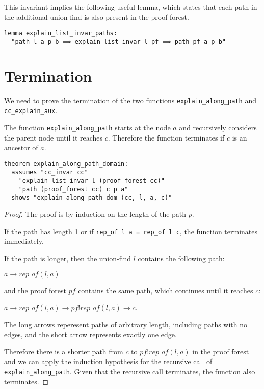 This invariant implies the following useful lemma, which states that each path in the additional union-find is also present in the proof forest.

\begin{lstlisting}
lemma explain_list_invar_paths:
  "path l a p b ⟹ explain_list_invar l pf ⟹ path pf a p b"
\end{lstlisting}

\section{Termination}

We need to prove the termination of the two functions \lstinline{explain_along_path} and \lstinline{cc_explain_aux}.

The function \lstinline{explain_along_path} starts at the node $a$ and recursively considers the parent node until it reaches $c$. Therefore the function terminates if $c$ is an ancestor of $a$.

\begin{lstlisting}
theorem explain_along_path_domain:
  assumes "cc_invar cc"
    "explain_list_invar l (proof_forest cc)"
    "path (proof_forest cc) c p a"
  shows "explain_along_path_dom (cc, l, a, c)"
\end{lstlisting}

\begin{proof}
The proof is by induction on the length of the path $p$.

If the path has length 1 or if \lstinline{rep_of l a = rep_of l c}, the function terminates immediately.

If the path is longer, then the union-find $l$ contains the following path:

$a \longrightarrow rep\_of(l,a)$

and the proof forest $pf$ contains the same path, which continues until it reaches $c$:

$a \longrightarrow rep\_of(l,a) \rightarrow pf ! rep\_of(l,a) \longrightarrow c$.

The long arrows reperesent paths of arbitrary length, including paths with no edges, and the short arrow represents exactly one edge.

Therefore there is a shorter path from $c$ to $pf ! rep\_of(l,a)$ in the proof forest and we can apply the induction hypothesis for the recursive call of \lstinline{explain_along_path}. Given that the recursive call terminates, the function also terminates.
\end{proof}


